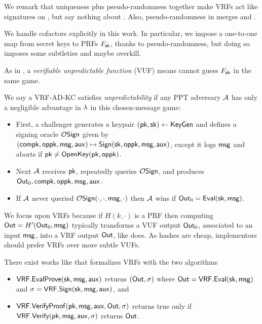 We remark that uniqueness plus pseudo-randomness together make VRFs 
act like signatures on \msg, but say nothing about \aux.
Also, pseudo-randomness in \cite{vrf_micali} merges \Eval and \Sign.

We handle cofactors explicitly in this work.  In particular, we impose
a one-to-one map from secret keys \sk to PRFs $F_\mathsf{sk}$, thanks to
 pseudo-randomness, but doing so imposes some subtleties and maybe overkill.


As in \cite{agg_dkg}, a {\em verifiable unpredictable function} (VUF)
means \adv cannot guess $F_\mathsf{sk}$ in the same game.

\begin{definition}
We say a VRF-AD-KC satisfies {\em unpredictability} if 
any PPT adversary $\mathcal{A}$ has only a negligible advantage in $\lambda$
in this chosen-message game:
\begin{itemize}
 \item First, a challenger
  generates a keypair $(\mathsf{pk},\mathsf{sk}) \leftarrow {\ensuremath{\mathsf{KeyGen}}}$ and
  defines a signing oracle $\mathcal{O}\mathsf{Sign}$ given by
  $(\mathsf{compk},\mathsf{oppk},\mathsf{msg},\mathsf{aux}) \mapsto {\ensuremath{\mathsf{Sign}}}(\mathsf{sk},\mathsf{oppk},\mathsf{msg},\mathsf{aux})$,
   except it logs $\mathsf{msg}$ and aborts if $\mathsf{pk} \ne {\ensuremath{\mathsf{OpenKey}}}(\mathsf{pk},\mathsf{oppk})$.
 \item Next $\mathcal{A}$ receives $\mathsf{pk}$, repeatedly queries $\mathcal{O}\mathsf{Sign}$,
  and produces ${\mathsf{Out}}_0,\mathsf{compk},\mathsf{oppk},\mathsf{msg},\mathsf{aux}$. 
 \item If $\mathcal{A}$ never queried $\mathcal{O}\mathsf{Sign}(\cdot,\cdot,\mathsf{msg},\cdot)$ then
  $\mathcal{A}$ wins if ${\mathsf{Out}}_0 = {\mathsf{Eval}}(\mathsf{sk},\mathsf{msg})$.
\end{itemize}
\end{definition}

We focus upon VRFs because
if $H(k,\cdot)$ is a PRF then computing ${\mathsf{Out}} = H'({\mathsf{Out}}_0, \mathsf{msg})$
typically transforms a VUF output ${\mathsf{Out}}_0$, associated to an input $\mathsf{msg}$,
into a VRF output ${\mathsf{Out}}$, like \cite[Proposition 1]{vrf_micali} does.
As hashes are cheap, implementors should prefer VRFs over more subtle VUFs.


There exist works like \cite[\S3.2 $\fvrf$]{praos} that formalizes VRFs with the two algorithms
\begin{itemize}
\item ${\mathsf{VRF}}.{\mathsf{EvalProve}}(\mathsf{sk},\mathsf{msg},\mathsf{aux})$ returns $({\mathsf{Out}},\sigma)$ where ${\mathsf{Out}} = {\mathsf{VRF}}.{\mathsf{Eval}}(\mathsf{sk},\mathsf{msg})$ and $\sigma = {\mathsf{VRF}}.{\mathsf{Sign}}(\mathsf{sk},\mathsf{msg},\mathsf{aux})$, and
\item ${\mathsf{VRF}}.{\mathsf{VerifyProof}}(\mathsf{pk},\mathsf{msg},\mathsf{aux},{\mathsf{Out}},\sigma)$ returns true only if ${\mathsf{VRF}}.{\mathsf{Verify}}(\mathsf{pk},\mathsf{msg},\mathsf{aux},\sigma)$ returns ${\mathsf{Out}}$.
\end{itemize}

